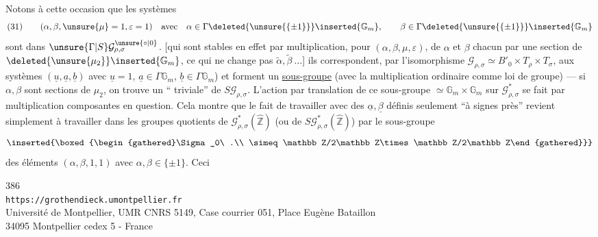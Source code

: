 Notons à cette occasion que les systèmes
\[
(31)\qquad
(\alpha,\beta,\unsure{\mu}=1,\varepsilon=1)
\quad\text{avec}\quad
\alpha\in\Gamma\deleted{\unsure{\{\pm1\}}}\inserted{\mathbb G_m},\qquad
\beta\in\Gamma\deleted{\unsure{\{\pm1\}}}\inserted{\mathbb G_m}
\]
sont dans $\unsure{\Gamma|S}\mathcal G_{\rho,\sigma}^{\unsure{\circ|0}}$.
[qui sont stables en effet par multiplication, pour $(\alpha,\beta,\mu,\varepsilon)$, de $\alpha$ et $\beta$ chacun par une section de $\deleted{\unsure{\mu_2}}\inserted{\mathbb G_m}$, ce qui ne change pas $\widetilde\alpha,\widetilde\beta\ \ldots$]
ils correspondent, par l'isomorphisme $\mathcal G_{\rho,\sigma}\simeq B'_0\times T_\rho\times T_\sigma$, aux systèmes $(\underline u,\underline a,\underline b)$ avec $\underline u=1$, $\underline a\in\Gamma\mathbb G_m$, $\underline b\in\Gamma\mathbb G_m$) et forment un \uline{sous-groupe} (avec la multiplication ordinaire    comme loi de groupe) --- si $\alpha,\beta$ sont sections de $\mu_2$, on trouve un   `` triviale''  de $S\mathcal G_{\rho,\sigma}$.
L'action par translation de ce sous-groupe $\simeq\mathbb G_m\times\mathbb G_m$ sur $\mathcal G_{\rho,\sigma}^{*}$ se fait par multiplication    composantes en question. Cela montre que le fait de travailler avec des $\underline\alpha,\underline\beta$ définis seulement ``à signes près'' revient simplement à travailler dans les groupes quotients de \uline{$\mathcal G_{\rho,\sigma}^{*}(\widehat{\mathbb Z})$} (ou de $S\mathcal G_{\rho,\sigma}^{*}(\widehat{\mathbb Z})$) par le sous-groupe
\[
\inserted{\boxed{\begin{gathered}\Sigma_0\ .\\ \simeq\mathbb Z/2\mathbb Z\times\mathbb Z/2\mathbb Z\end{gathered}}}
\]
 des éléments $(\alpha,\beta,1,1)$ avec $\alpha,\beta\in\{\pm1\}$. Ceci

\begin{center}
386\\
\texttt{https://grothendieck.umontpellier.fr}\\
Université de Montpellier, UMR CNRS 5149, Case courrier 051, Place Eugène Bataillon\\
34095 Montpellier cedex 5 - France
\end{center}


